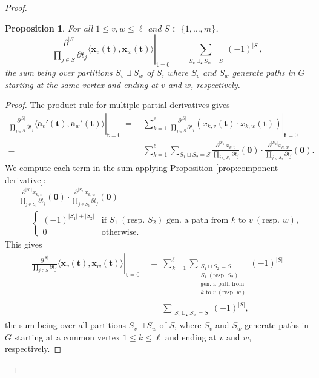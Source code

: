 \documentclass[12pt, reqno, oneside]{amsart}
\newtheorem{proposition}[corollary]{Proposition}
\numberwithin{equation}{section}
\begin{document}
\begin{proof}
\begin{proposition}
For all $1 \leq v, w \leq \ell$ and $S \subset \{1, \dots, m\}$,
\begin{equation}\label{eq:A-partitions}
\left.\frac{\partial^{|S|}}{\prod_{j \in S}\partial t_j} \langle \mathbf{x}_v(\mathbf{t}),\mathbf{x}_w(\mathbf{t}) \rangle\right|_{\mathbf{t} = 0} \ = \ \sum_{\substack{S_v \sqcup_\star S_w = S}} (-1)^{|S|},
\end{equation}
the sum being over partitions $S_v \sqcup S_w$ of $S$, where $S_v$ and $S_w$ generate paths in $G$ starting at the same vertex and ending at $v$ and $w$, respectively. 
\end{proposition}
\begin{proof}
The product rule for multiple partial derivatives gives
\begin{align}
\nonumber
\left.\frac{\partial^{|S|}}{\prod_{j \in S}\partial t_j} \langle \mathbf{a}_v'(\mathbf{t}),\mathbf{a}_w'(\mathbf{t}) \rangle\right|_{\mathbf{t} = 0} \ =& \ \sum_{k=1}^\ell \left.\frac{\partial^{|S|}}{\prod_{j \in S}\partial t_j} \left(x_{k,v}(\mathbf{t}) \cdot x_{k,w}(\mathbf{t})\right)\right|_{\mathbf{t} = 0} \\
=& \ \sum_{k=1}^\ell \sum_{S_1 \sqcup S_2 = S} \frac{\partial^{|S_1|}x_{k,v}}{\prod_{j \in S_1}\partial t_j}(\mathbf{0}) \cdot \frac{\partial^{|S_2|}x_{k,w}}{\prod_{j \in S_2}\partial t_j}(\mathbf{0}).
\end{align}
We compute each term in the sum applying Proposition \ref{prop:component-derivative}:  
\begin{align}
\nonumber
&\frac{\partial^{|S_1|}x_{k,v}}{\prod_{j \in S_1}\partial t_j}(\mathbf{0}) \cdot \frac{\partial^{|S_2|}x_{k,w}}{\prod_{j \in S_2}\partial t_j}(\mathbf{0})\\
&= \ \begin{cases}
    (-1)^{|S_1|+|S_2|} & \text{if } S_1 \ (\text{resp. } S_2) \text{ gen. a path from } k \text{ to } v \  (\text{resp. } w), \\
    0 & \text{otherwise}.
\end{cases}
\end{align}
This gives
\begin{align}
\nonumber
\left.\frac{\partial^{|S|}}{\prod_{j \in S}\partial t_j} \langle \mathbf{x}_v(\mathbf{t}),\mathbf{x}_w(\mathbf{t}) \rangle\right|_{\mathbf{t} = 0} \ &= \ \sum_{k=1}^\ell \sum_{\substack{S_1 \sqcup S_2 = S, \\ S_1 \ (\text{resp. } S_2) \\ \text{gen. a path from} \\ k \text{ to } v \ (\text{resp. } w)}} (-1)^{|S|} \\
&= \ \sum_{\substack{S_v \sqcup_\star S_w = S}} (-1)^{|S|},
\end{align}
the sum being over all partitions $S_v \sqcup S_w$ of $S$, where $S_v$ and $S_w$ generate paths in $G$ starting at a common vertex $1 \leq k \leq \ell$ and ending at $v$ and $w$, respectively. 
\end{proof}


\end{proof}
\end{document}
